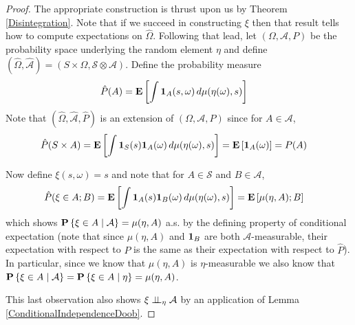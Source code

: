 \begin{proof}
The appropriate construction is thrust upon us by Theorem
\ref{Disintegration}.  Note that if we succeed in constructing $\xi$
then that result tells how to compute expectations on $\hat{\Omega}$.
Following that lead, let $(\Omega, \mathcal{A}, P)$ be the probability
space underlying the random element $\eta$ and define
$(\hat{\Omega}, \hat{\mathcal{A}}) = (S \times \Omega,
\mathcal{S} \otimes \mathcal{A})$.  Define the probability measure 
\begin{align*}
\hat{P}(A) &= \textbf{E}\left[\int \textbf{1}_{A}(s,\omega) \,
  d\mu(\eta(\omega), s)\right]
\end{align*}
Note that $(\hat{\Omega}, \hat{\mathcal{A}},\hat{P})$ is an extension
of $(\Omega, \mathcal{A}, P)$ since for $A \in \mathcal{A}$, 
\begin{align*}
\hat{P}(S \times A) &= \textbf{E}\left[\int \textbf{1}_{S}(s)\textbf{1}_{A}(\omega) \,
  d\mu(\eta(\omega), s)\right] = \textbf{E}\left[\textbf{1}_{A}(\omega)\right] = P(A)
\end{align*}

Now define $\xi(s, \omega) = s$ and note that for $A \in \mathcal{S}$
and $B \in \mathcal{A}$, 
\begin{align*}
\hat{P}(\xi \in A ; B) &=  \textbf{E}\left[\int \textbf{1}_{A}(s)\textbf{1}_{B}(\omega) \,
  d\mu(\eta(\omega), s)\right] = \textbf{E}\left[\mu(\eta, A) ; B\right]
\end{align*}
which shows $\textbf{P} \left \{\xi \in A \mid \mathcal{A} \right \}= \mu(\eta, A)$ a.s. 
by the defining property of conditional expectation (note that since
$\mu(\eta, A)$ and $\textbf{1}_{B}$ are both
$\mathcal{A}$-measurable, their expectation with respect to $P$ is the
same as their expectation with respect to $\hat{P}$).  In particular,
since we know that $\mu(\eta, A)$ is $\eta$-measurable we also know
that $\textbf{P} \left \{\xi \in A \mid \mathcal{A} \right \}=\textbf{P} \left \{\xi \in A \mid \eta \right \} = \mu(\eta, A)$.

This last observation also shows $\xi \perp \! \! \! \perp_{\eta} \mathcal{A}$ by an application of Lemma \ref{ConditionalIndependenceDoob}.
\end{proof}

